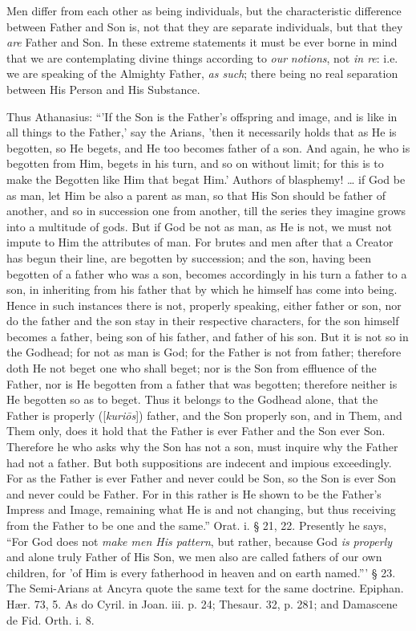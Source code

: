 Men differ from each other as being individuals,
but the characteristic difference between Father and Son is, not that
they are separate individuals, but that they \emph{are}
Father and Son. In these extreme statements it must be ever borne in
mind that we are contemplating divine things according to \emph{our}
\emph{notions}, not \emph{in re}: i.e. we are speaking of the Almighty Father, \emph{as
such}; there being no real separation between His Person and His
Substance.

Thus Athanasius: ``'If the Son is the Father's
offspring and image, and is like in all things to the Father,' say the
Arians, 'then it necessarily holds that as He is begotten, so He
begets, and He too becomes father of a son. And again, he who is
begotten from Him, begets in his turn, and so on without limit; for
this is to make the Begotten like Him that begat Him.' Authors of
blasphemy! … if God be as man, let Him be also a parent as man, so
that His Son should be father of another, and so in succession one
from another, till the series they imagine grows into a multitude of
gods. But if God be not as man, as He is not, we must not impute to
Him the attributes of man. For brutes and men after that a Creator has
begun their line, are begotten by succession; and the son, having been
begotten of a father who was a son, becomes accordingly in his turn a
father to a son, in inheriting from his father that by which he
himself has come into being. Hence in such instances there is not,
properly speaking, either father or son, nor do the father and
the son stay in their respective characters, for the son himself
becomes a father, being son of his father, and father of his son. But
it is not so in the Godhead; for not as man is God; for the Father is
not from father; therefore doth He not beget one who shall beget; nor
is the Son from effluence of the Father, nor is He begotten from a
father that was begotten; therefore neither is He begotten so as to
beget. Thus it belongs to the Godhead alone, that the Father is
properly ([\emph{kuri\={o}s}]) father, and the Son properly son,
and in Them, and Them only, does it hold that the Father is ever
Father and the Son ever Son. Therefore he who asks why the Son has not
a son, must inquire why the Father had not a father. But both
suppositions are indecent and impious exceedingly. For as the Father
is ever Father and never could be Son, so the Son is ever Son and
never could be Father. For in this rather is He shown to be the Father's
Impress and Image, remaining what He is and not changing, but thus
receiving from the Father to be one and the same.'' Orat. i. §
21, 22. Presently he says, ``For God does not \emph{make
men His pattern}, but rather, because God \emph{is}
\emph{properly} and alone truly
Father of His Son, we men also are called fathers of our own children,
for 'of Him is every fatherhood in heaven and on earth named.''' § 23.
The Semi-Arians at Ancyra quote the same text for the same doctrine.
Epiphan. Hær. 73, 5. As
do Cyril. in Joan. iii. p. 24; Thesaur. 32, p. 281; and Damascene de
Fid. Orth. i. 8.

